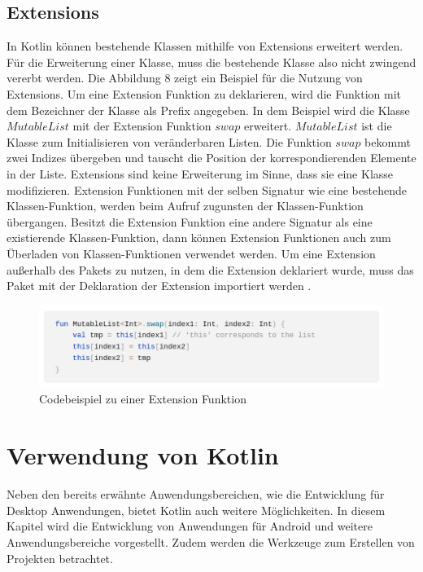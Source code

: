 \documentclass{article}
\begin{document}
\subsection{Extensions}
In Kotlin können bestehende Klassen mithilfe von Extensions erweitert werden. Für die Erweiterung einer Klasse, muss die bestehende Klasse also nicht zwingend vererbt werden. Die Abbildung 8 zeigt ein Beispiel für die Nutzung von Extensions.  Um eine Extension Funktion zu deklarieren, wird die Funktion mit dem Bezeichner der Klasse als Prefix angegeben. In dem Beispiel wird die Klasse $MutableList$ mit der Extension Funktion $swap$ erweitert. $MutableList$ ist die Klasse zum Initialisieren von veränderbaren Listen. Die Funktion $swap$ bekommt zwei Indizes übergeben und tauscht die Position der korrespondierenden Elemente in der Liste. \newline
Extensions sind keine Erweiterung im Sinne, dass sie eine Klasse modifizieren. Extension Funktionen mit der selben Signatur wie eine bestehende Klassen-Funktion, werden beim Aufruf zugunsten der Klassen-Funktion übergangen. Besitzt die Extension Funktion eine andere Signatur als eine existierende Klassen-Funktion, dann können Extension Funktionen auch zum Überladen von Klassen-Funktionen verwendet werden. Um eine Extension außerhalb des Pakets zu nutzen, in dem die Extension deklariert wurde, muss das Paket mit der Deklaration der Extension importiert werden \cite{KotlinLangDocExtensions}.
\begin{figure}[!htb]
    \centering
    \includegraphics[width=\columnwidth]{img/Extensions.png}
    \caption{Codebeispiel zu einer Extension Funktion\footnotemark}
\end{figure}

\section{Verwendung von Kotlin}
Neben den bereits erwähnte Anwendungsbereichen, wie die Entwicklung für Desktop Anwendungen, bietet Kotlin auch weitere Möglichkeiten. In diesem Kapitel wird die Entwicklung von Anwendungen für Android und weitere Anwendungsbereiche vorgestellt. Zudem werden die Werkzeuge zum Erstellen von Projekten betrachtet.
\end{document}
